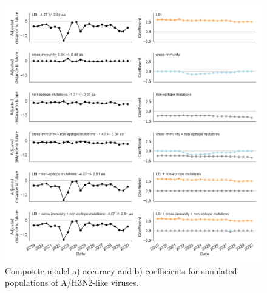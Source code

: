 \begin{figure}[t]
  \begin{center}
  \includegraphics[width=\textwidth]{figures/composite-model-accuracy-and-coefficients-for-simulated-populations.png}
  \caption{Composite model a) accuracy and b) coefficients for simulated populations of A/H3N2-like viruses.}
  \label{sup_fig:composite_model_accuracy_and_coefficients_for_simulated_populations}
  \end{center}
\end{figure}
